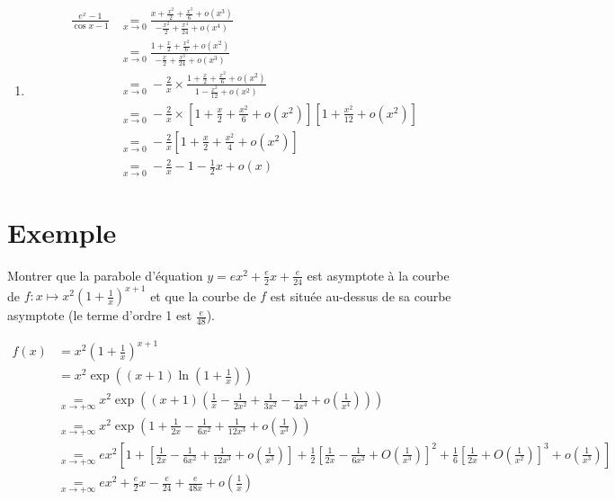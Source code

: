 \documentclass[../main.tex]{subfiles}
\begin{document}
\begin{enumerate}
    \item \begin{align*}
        \frac{e^x - 1}{\cos x - 1} &\underset{x\to 0}{=} \frac{x + \frac{x^2}{2} + \frac{x^3}{6} + o(x^3)}{-\frac{x^2}{2} + \frac{x^4}{24} + o(x^4)} \\
        &\underset{x\to 0}{=} \frac{1 + \frac{x}{2} + \frac{x^2}{6} + o(x^2)}{-\frac{x}{2} + \frac{x^3}{24} + o(x^3)} \\
        &\underset{x\to 0}{=} -\frac{2}{x} \times \frac{1 + \frac{x}{2} + \frac{x^2}{6} + o(x^2)}{1 - \frac{x^2}{12} + o(x^2)} \\
        &\underset{x\to 0}{=}  -\frac{2}{x} \times \left[ 1 + \frac{x}{2} + \frac{x^2}{6} + o(x^2) \right] \left[ 1 + \frac{x^2}{12} + o(x^2) \right] \\
        &\underset{x\to 0}{=} -\frac{2}{x} \left[ 1 + \frac{x}{2} + \frac{x^2}{4} + o(x^2) \right] \\
        &\underset{x\to 0}{=} -\frac{2}{x} - 1 - \frac{1}{2}x + o(x)
    \end{align*}
\end{enumerate}

\section{Exemple}
\begin{tcolorbox}[title=Exemple, title filled=false, colframe=darkgreen, colback=darkgreen!10!white]
    Montrer que la parabole d'équation $y = ex^2 + \frac{e}{2}x + \frac{e}{24}$ est asymptote à la courbe de $f:x\mapsto x^2 \left( 1 + \frac{1}{x} \right)^{x+1}$ et que la courbe de $f$ est située au-dessus de sa courbe asymptote (le terme d'ordre 1 est $\frac{e}{48}$).
\end{tcolorbox}

\begin{align*}
    f(x) &= x^2 \left( 1 + \frac{1}{x} \right)^{x+1} \\
    &= x^2 \exp \left( (x+1) \ln \left( 1 + \frac{1}{x} \right) \right) \\
    &\underset{x\to +\infty}{=} x^2 \exp \left( (x+1) \left( \frac{1}{x} - \frac{1}{2x^2} + \frac{1}{3x^2} - \frac{1}{4x^4} + o \left( \frac{1}{x^4} \right) \right) \right) \\
    &\underset{x\to +\infty}{=} x^2 \exp \left( 1 + \frac{1}{2x} - \frac{1}{6x^2} + \frac{1}{12x^3} + o \left( \frac{1}{x^3} \right) \right) \\
    &\underset{x\to +\infty}{=} ex^2 \left[ 1 + \left[ \frac{1}{2x} - \frac{1}{6x^2} + \frac{1}{12x^3} + o \left( \frac{1}{x^3} \right) \right] + \frac{1}{2} \left[ \frac{1}{2x} - \frac{1}{6x^2} + O \left( \frac{1}{x^3} \right) \right]^2 + \frac{1}{6} \left[ \frac{1}{2x} + O \left( \frac{1}{x^2} \right) \right]^3 + o \left( \frac{1}{x^3} \right) \right] \\
    &\underset{x\to +\infty}{=} ex^2 + \frac{e}{2}x - \frac{e}{24} + \frac{e}{48x} + o \left( \frac{1}{x} \right)
\end{align*}
\end{document}
